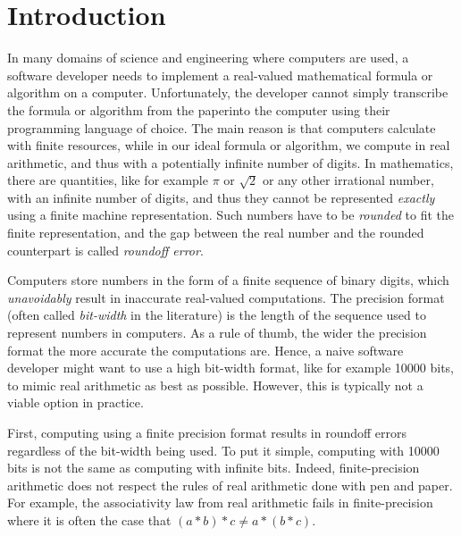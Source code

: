 
\chapter{Introduction}

\setupuuchapterbib
%
In many domains of science and engineering where computers are used, a software developer needs to implement a real-valued mathematical formula or algorithm on a computer.
%
Unfortunately, the developer cannot simply transcribe the formula or algorithm \textquotesingle\textquotesingle from the paper\textquotesingle\textquotesingle \space into the computer using their programming language of choice.
%
The main reason is that computers calculate with finite resources, while in our ideal formula or algorithm, we compute in real arithmetic, and thus with a potentially infinite number of digits.
%
In mathematics, there are quantities, like for example $\pi$ or $\sqrt{2}$ or any other irrational number, with an infinite number of digits, and thus they cannot be represented \emph{exactly} using a finite machine representation.
%
%
Such numbers have to be \emph{rounded} to fit the finite representation, and the gap between the real number and the rounded counterpart is called \emph{roundoff error}.
%

%
Computers store numbers in the form of a finite sequence of binary digits, which \emph{unavoidably} result in inaccurate real-valued computations.
%
The precision format (often called \emph{bit-width} in the literature) is the length of the sequence used to represent numbers in computers.
%
As a rule of thumb, the wider the precision format the more accurate the computations are.
%
Hence, a naive software developer might want to use a high bit-width format, like for example 10000 bits, to mimic real arithmetic as best as possible. 
%
However, this is typically not a viable option in practice.
%

First, computing using a finite precision format results in roundoff errors regardless of the bit-width being used.
%
To put it simple, computing with 10000 bits is not the same as computing with infinite bits.
%
Indeed, finite-precision arithmetic does not respect the rules of real arithmetic done with \textquotesingle \textquotesingle pen and paper\textquotesingle\textquotesingle.
%
For example, the associativity law from real arithmetic fails in finite-precision where it is often the case that $(a*b)*c \ne a*(b*c)$.

